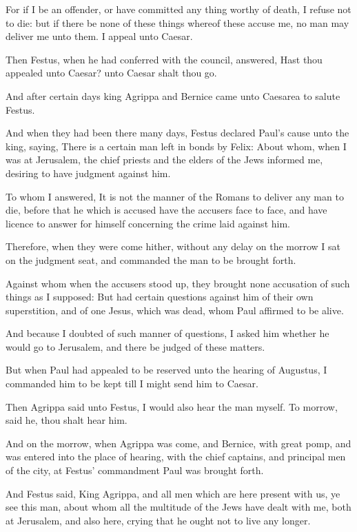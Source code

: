 \Verse For if I be an offender, or have committed any thing worthy of death, I refuse not to die: but if there be none of these things whereof these accuse me, no man may deliver me unto them. I appeal unto Caesar.

\Verse Then Festus, when he had conferred with the council, answered, Hast thou appealed unto Caesar? unto Caesar shalt thou go.

\Verse And after certain days king Agrippa and Bernice came unto Caesarea to salute Festus.

\Verse And when they had been there many days, Festus declared Paul's cause unto the king, saying, There is a certain man left in bonds by Felix: \Verse About whom, when I was at Jerusalem, the chief priests and the elders of the Jews informed me, desiring to have judgment against him.

\Verse To whom I answered, It is not the manner of the Romans to deliver any man to die, before that he which is accused have the accusers face to face, and have licence to answer for himself concerning the crime laid against him.

\Verse Therefore, when they were come hither, without any delay on the morrow I sat on the judgment seat, and commanded the man to be brought forth.

\Verse Against whom when the accusers stood up, they brought none accusation of such things as I supposed: \Verse But had certain questions against him of their own superstition, and of one Jesus, which was dead, whom Paul affirmed to be alive.

\Verse And because I doubted of such manner of questions, I asked him whether he would go to Jerusalem, and there be judged of these matters.

\Verse But when Paul had appealed to be reserved unto the hearing of Augustus, I commanded him to be kept till I might send him to Caesar.

\Verse Then Agrippa said unto Festus, I would also hear the man myself.  To morrow, said he, thou shalt hear him.

\Verse And on the morrow, when Agrippa was come, and Bernice, with great pomp, and was entered into the place of hearing, with the chief captains, and principal men of the city, at Festus' commandment Paul was brought forth.

\Verse And Festus said, King Agrippa, and all men which are here present with us, ye see this man, about whom all the multitude of the Jews have dealt with me, both at Jerusalem, and also here, crying that he ought not to live any longer.

